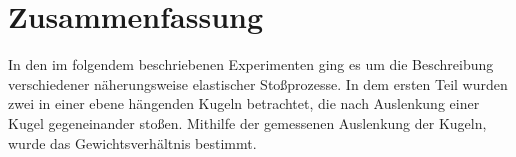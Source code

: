 
\section{Zusammenfassung}
In den im folgendem beschriebenen Experimenten ging es um die Beschreibung verschiedener näherungsweise elastischer  Stoßprozesse.  In dem ersten Teil wurden zwei in einer ebene hängenden Kugeln betrachtet, die nach Auslenkung einer Kugel gegeneinander stoßen. Mithilfe der gemessenen Auslenkung der Kugeln, wurde das Gewichtsverhältnis bestimmt.
